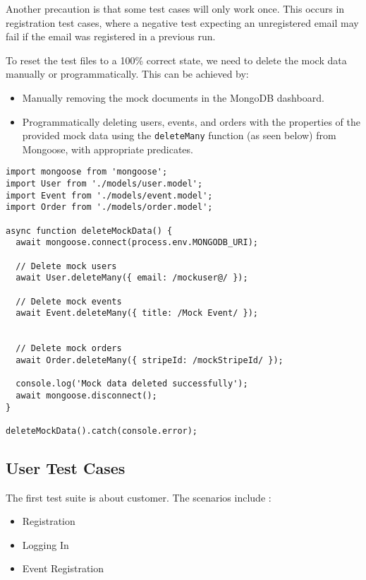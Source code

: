 Another precaution is that some test cases will only work once. This occurs in registration test cases, where a negative test expecting an unregistered email may fail if the email was registered in a previous run.

To reset the test files to a 100\% correct state, we need to delete the mock data manually or programmatically. This can be achieved by:
\begin{itemize}
    \item Manually removing the mock documents in the MongoDB dashboard.
    \item Programmatically deleting users, events, and orders with the properties of the provided mock data using the \texttt{deleteMany}\cite{mongoose_deletemany} function (as seen below) from Mongoose, with appropriate predicates.
\end{itemize}

\vspace{1cm}
\begin{lstlisting}[style=typescript, caption={Example Code for Deleting Mock Data}]
import mongoose from 'mongoose';
import User from './models/user.model';
import Event from './models/event.model';
import Order from './models/order.model';

async function deleteMockData() {
  await mongoose.connect(process.env.MONGODB_URI);

  // Delete mock users
  await User.deleteMany({ email: /mockuser@/ });

  // Delete mock events
  await Event.deleteMany({ title: /Mock Event/ });


  // Delete mock orders
  await Order.deleteMany({ stripeId: /mockStripeId/ });

  console.log('Mock data deleted successfully');
  await mongoose.disconnect();
}

deleteMockData().catch(console.error);
\end{lstlisting}   

\subsection{User Test Cases}
The first test suite is about customer. The scenarios include :
\begin{itemize}
    \item Registration
    \item Logging In
    \item Event Registration
\end{itemize}

